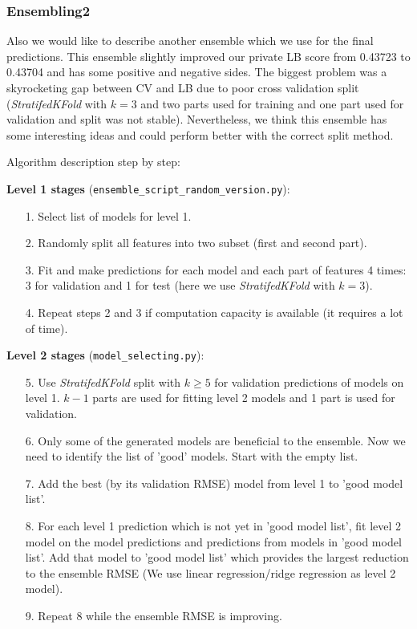 \documentclass[12pt]{article}
\begin{document}
{{\subsubsection{Ensembling2}
Also we would like to describe another ensemble which we use for the final predictions.
This ensemble slightly improved our private LB score from 0.43723 to 0.43704 and has some positive and negative sides. The biggest problem was a skyrocketing gap between CV and LB due to poor cross validation split (\emph{StratifedKFold} with $k = 3$ and two parts used for training and one part used for validation and split was not stable). Nevertheless, we think this ensemble has some interesting ideas and could perform better with the correct split method.

Algorithm description step by step:

\textbf{Level 1 stages} (\texttt{ensemble\_script\_random\_version.py}):
\begin{itemize}
\item[1.] Select list of models for level 1.
\item[2.] Randomly split all features into two subset (first and second part).
\item[3.] Fit and make predictions for each model and each part of features 4 times: 3 for validation and 1 for test (here we use \emph{StratifedKFold} with $k = 3$).
\item[4.] Repeat steps 2 and 3 if computation capacity is available (it requires a lot of time).
\end{itemize}

\textbf{Level 2 stages} (\texttt{model\_selecting.py}):
\begin{itemize}
\item[5.] Use \emph{StratifedKFold} split with $k \geq 5$ for validation predictions of models on level 1. $k-1$ parts are used for fitting level 2 models and 1 part is used for validation.
\item[6.] Only some of the generated models are beneficial to the ensemble. Now we need to identify the list of 'good' models. Start with the empty list.
\item[7.] Add the best (by its validation RMSE) model from level 1 to 'good model list'.
\item[8.] For each level 1 prediction which is not yet in 'good model list', fit level 2 model on the model predictions and predictions from models in 'good model list'. Add that model to 'good model list'  which provides the largest reduction to the ensemble RMSE (We use linear regression/ridge regression as level 2 model).
\item[9.] Repeat 8 while the ensemble RMSE is improving.
\end{itemize}

}}
\end{document}
